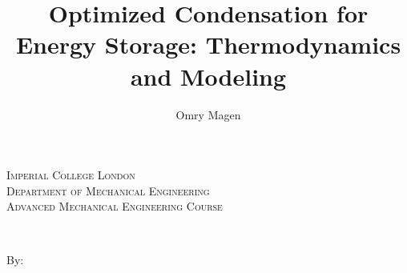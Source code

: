 \begin{titlepage}
\title{Optimized Condensation for Energy Storage:
Thermodynamics and Modeling}
\author{Omry Magen}

\newcommand{\HRule}{\rule{\linewidth}{0.5mm}} %


 

\center %


\vspace*{3cm}
\textsc{\Large Imperial College London}\\[1.5cm] %
\textsc{\large Department of Mechanical Engineering}\\[0.5cm] %
\textsc{\large Advanced Mechanical Engineering Course}\\[1.5cm] %

\makeatletter

{ \huge \bfseries \@title}\\[1cm] %

 




\begin{minipage}{0.4\textwidth}
\centering \large
By:\\
\@author %
\end{minipage}\\[0.1cm]



\end{titlepage}
